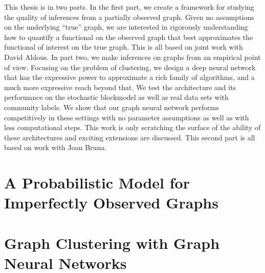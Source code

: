 \documentclass{ucbthesis}
\theoremstyle{definition}
\theoremstyle{remark}
\begin{document}
This thesis is in two parts.  In the first part, we create a framework for studying the quality of inferences from a partially observed graph.  Given no assumptions on the underlying ``true'' graph, we are interested in rigorously understanding how to quantify a functional on the observed graph that best approximates the functional of interest on the true graph. This is all based on joint work with David Aldous.  In part two, we make inferences on graphs from an empirical point of view.  Focusing on the problem of clustering, we design a deep neural network that has the expressive power to approximate a rich family of algorithms, and a much more expressive reach beyond that.  We test the architecture and its performance on the stochastic blockmodel as well as real data sets with community labels.  We show that our graph neural network performs competitively in these settings with no parameter assumptions as well as with less computational steps. This work is only scratching the surface of the ability of these architectures and exciting extensions are discussed.  This second part is all based on work with Joan Bruna. 

\part{A Probabilistic Model for Imperfectly Observed Graphs}







\part{Graph Clustering with Graph Neural Networks}





%

\appendix
\printbibliography
\end{document}
